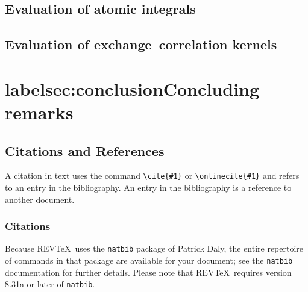 \documentclass[%
 reprint,
 amsmath,amssymb,
 aps,
]{revtex4-1}
\begin{document}
\subsection{\label{sec:integrals}Evaluation of atomic integrals}

\subsection{\label{sec:XCkernels}Evaluation of exchange--correlation kernels}

\section{label{sec:conclusion}Concluding remarks}


\subsection{\label{sec:citeref}Citations and References}
A citation in text uses the command \verb+\cite{#1}+ or \verb+\onlinecite{#1}+
and refers to an entry in the bibliography. An entry in the bibliography is a
reference to another document.

\subsubsection{Citations}
Because REV\TeX\ uses the \verb+natbib+ package of Patrick Daly,
the entire repertoire of commands in that package are available for your document;
see the \verb+natbib+ documentation for further details. Please note that
REV\TeX\ requires version 8.31a or later of \verb+natbib+.
\end{document}
